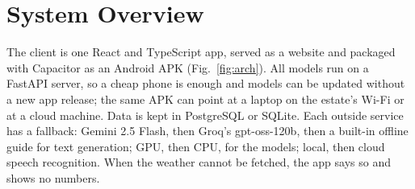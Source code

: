 \section{System Overview}
The client is one React and TypeScript app, served as a website and packaged with Capacitor as an Android APK
(Fig.~\ref{fig:arch}). All models run on a FastAPI server, so a cheap phone is enough and models can be updated without
a new app release; the same APK can point at a laptop on the estate's Wi-Fi or at a cloud machine. Data is kept in
PostgreSQL or SQLite. Each outside service has a fallback: Gemini 2.5 Flash, then Groq's gpt-oss-120b, then a built-in
offline guide for text generation; GPU, then CPU, for the models; local, then cloud speech recognition. When the weather
cannot be fetched, the app says so and shows no numbers.


